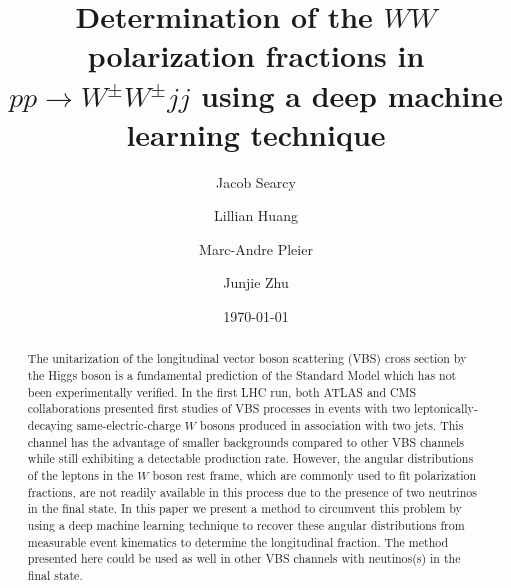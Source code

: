 \documentclass[aps,prl,twocolumn,showpacs,superscriptaddress,groupeaddress,floatfix]{revtex4}  %
\begin{document}
\title{Determination of the $WW$ polarization fractions in $pp \rightarrow W^\pm W^\pm jj$ using a deep machine learning technique}
\author{Jacob Searcy}
\author{Lillian Huang}
\author{Marc-Andre Pleier}
\author{Junjie Zhu}

\date{\today}

\begin{abstract}
The unitarization of the longitudinal vector boson scattering (VBS) cross section by the Higgs boson is 
a fundamental prediction of the Standard Model which has not been experimentally verified. In the first LHC run, 
both ATLAS and CMS collaborations presented first studies of VBS processes in events with two leptonically-decaying same-electric-charge 
$W$ bosons produced in association with two jets. This channel has the advantage of smaller backgrounds 
compared to other VBS channels while still exhibiting a detectable production rate. However, the angular distributions of the leptons in the $W$ boson rest frame, which are commonly used to 
fit polarization fractions, are not readily available in this process due to the presence of two neutrinos in the final state. 
In this paper we present a method to circumvent this problem by using a deep machine learning technique to recover these angular distributions from measurable event kinematics to determine the longitudinal fraction.  The method presented here could be used as well in other VBS channels with neutinos(s) in the final state. 
\end{abstract}

\maketitle


\end{document}
